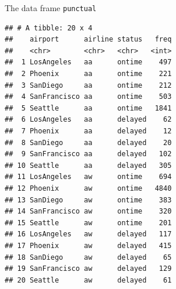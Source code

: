 \documentclass[unknownkeysallowed]{beamer}\usepackage[]{graphicx}\usepackage[]{color}
\makeatletter
\newenvironment{kframe}{%
 \def\at@end@of@kframe{}%
 \ifinner\ifhmode%
  \def\at@end@of@kframe{\end{minipage}}%
  \begin{minipage}{\columnwidth}%
 \fi\fi%
 \def\FrameCommand##1{\hskip\@totalleftmargin \hskip-\fboxsep
 \colorbox{shadecolor}{##1}\hskip-\fboxsep
     \hskip-\linewidth \hskip-\@totalleftmargin \hskip\columnwidth}%
 \MakeFramed {\advance\hsize-\width
   \@totalleftmargin\z@ \linewidth\hsize
   \@setminipage}}%
 {\par\unskip\endMakeFramed%
 \at@end@of@kframe}
\newenvironment{knitrout}{}{} %
\makeatother
\begin{document}
\begin{frame}[fragile]{The data frame \texttt{punctual}}

\begin{knitrout}\scriptsize
{}\color{fgcolor}\begin{kframe}
\begin{verbatim}
## # A tibble: 20 x 4
##    airport      airline status   freq
##    <chr>        <chr>   <chr>   <int>
##  1 LosAngeles   aa      ontime    497
##  2 Phoenix      aa      ontime    221
##  3 SanDiego     aa      ontime    212
##  4 SanFrancisco aa      ontime    503
##  5 Seattle      aa      ontime   1841
##  6 LosAngeles   aa      delayed    62
##  7 Phoenix      aa      delayed    12
##  8 SanDiego     aa      delayed    20
##  9 SanFrancisco aa      delayed   102
## 10 Seattle      aa      delayed   305
## 11 LosAngeles   aw      ontime    694
## 12 Phoenix      aw      ontime   4840
## 13 SanDiego     aw      ontime    383
## 14 SanFrancisco aw      ontime    320
## 15 Seattle      aw      ontime    201
## 16 LosAngeles   aw      delayed   117
## 17 Phoenix      aw      delayed   415
## 18 SanDiego     aw      delayed    65
## 19 SanFrancisco aw      delayed   129
## 20 Seattle      aw      delayed    61
\end{verbatim}
\end{kframe}
\end{knitrout}

  
\end{frame}
\end{document}
